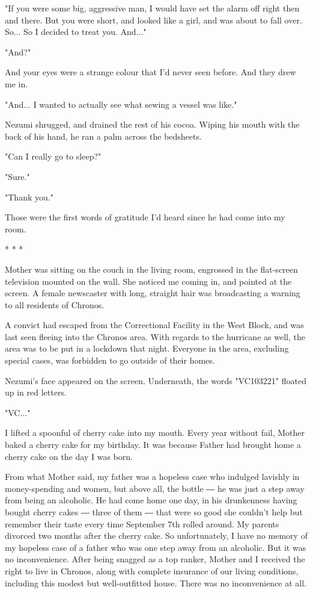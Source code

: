 "If you were some big, aggressive man, I would have set the alarm off
right then and there. But you were short, and looked like a girl, and
was about to fall over. So... So I decided to treat you. And..."

"And?"

And your eyes were a strange colour that I'd never seen before. And they
drew me in.

"And... I wanted to actually see what sewing a vessel was like."

Nezumi shrugged, and drained the rest of his cocoa. Wiping his mouth
with the back of his hand, he ran a palm across the bedsheets.

"Can I really go to sleep?"

"Sure."

"Thank you."

Those were the first words of gratitude I'd heard since he had come into
my room.

* * *

Mother was sitting on the couch in the living room, engrossed in the
flat-screen television mounted on the wall. She noticed me coming in,
and pointed at the screen. A female newscaster with long, straight hair
was broadcasting a warning to all residents of Chronos.

A convict had escaped from the Correctional Facility in the West Block,
and was last seen fleeing into the Chronos area. With regards to the
hurricane as well, the area was to be put in a lockdown that night.
Everyone in the area, excluding special cases, was forbidden to go
outside of their homes.

Nezumi's face appeared on the screen. Underneath, the words "VC103221"
floated up in red letters.

"VC..."

I lifted a spoonful of cherry cake into my mouth. Every year without
fail, Mother baked a cherry cake for my birthday. It was because Father
had brought home a cherry cake on the day I was born.

From what Mother said, my father was a hopeless case who indulged
lavishly in money-spending and women, but above all, the bottle ― he was
just a step away from being an alcoholic. He had come home one day, in
his drunkenness having bought cherry cakes ― three of them ― that were
so good she couldn't help but remember their taste every time September
7th rolled around. My parents divorced two months after the cherry cake.
So unfortunately, I have no memory of my hopeless case of a father who
was one step away from an alcoholic. But it was no inconvenience. After
being snagged as a top ranker, Mother and I received the right to live
in Chronos, along with complete insurance of our living conditions,
including this modest but well-outfitted house. There was no
inconvenience at all.

